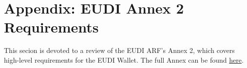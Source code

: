 \documentclass{iacrtrans}
\begin{document}




\section{Appendix: EUDI Annex 2 Requirements}

This secion is devoted to a review of the EUDI ARF's Annex 2, which covers high-level requirements for the EUDI Wallet. 
The full Annex can be found \href{https://eu-digital-identity-wallet.github.io/eudi-doc-architecture-and-reference-framework/1.4.0/annexes/annex-2/annex-2-high-level-requirements/#a231-topic-1-accessing-public-and-private-online-services-with-eudi-wallet}{here}.
\end{document}
